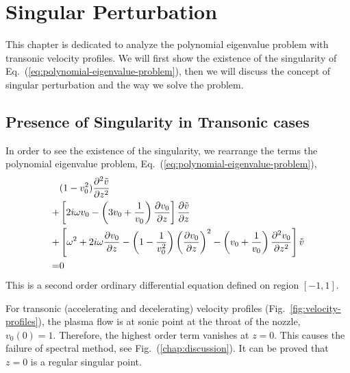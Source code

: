 \chapter{Singular Perturbation} \label{chap:singular-perturbation}
This chapter is dedicated to analyze the polynomial eigenvalue problem with transonic velocity profiles. We will first show the existence of the singularity of Eq.~(\ref{eq:polynomial-eigenvalue-problem}), then we will discuss the concept of singular perturbation and the way we solve the problem.

\section{Presence of Singularity in Transonic cases} \label{sec:presence-of-singularity}
In order to see the existence of the singularity, we rearrange the terms the polynomial eigenvalue problem, Eq.~(\ref{eq:polynomial-eigenvalue-problem}),
\begin{equation} \label{eq:singular-perturbation-problem}
	\begin{aligned}
		  & (1-v_0^2)\pdv[2]{\tilde{v}}{z}                                                                                                                                        \\
		+ & \left[2i\omega v_0 - \left(3v_0 + \frac{1}{v_0}\right)\pdv{v_0}{z}\right]\pdv{\tilde{v}}{z}                                                                           \\
		+ & \left[\omega^2 + 2i\omega\pdv{v_0}{z} -\left(1 - \frac{1}{v_0^2}\right)\left(\pdv{v_0}{z}\right)^2 - \left(v_0 + \frac{1}{v_0}\right)\pdv[2]{v_0}{z} \right]\tilde{v} \\
		= & 0
	\end{aligned}
\end{equation}
This is a second order ordinary differential equation defined on region $[-1,1]$.

For transonic (accelerating and decelerating) velocity profiles (Fig.~\ref{fig:velocity-profiles}), the plasma flow is at sonic point at the throat of the nozzle, $v_0(0)=1$. Therefore, the highest order term vanishes at $z=0$. This causes the failure of spectral method, see Fig.~(\ref{chap:discussion}). It can be proved that $z=0$ is a regular singular point.

